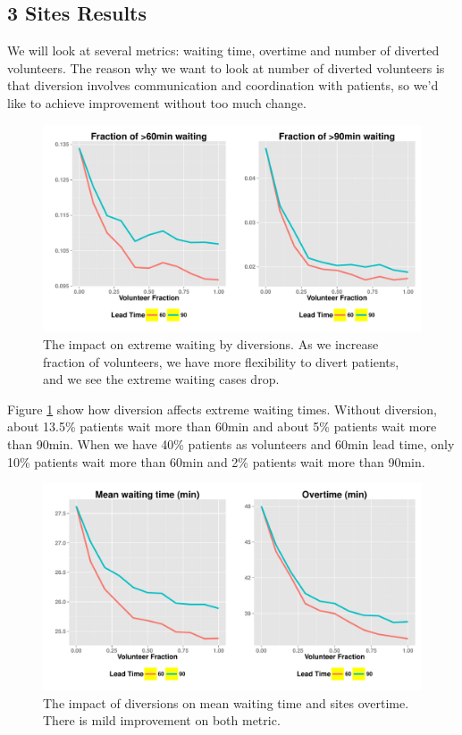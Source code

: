 \subsection{3 Sites Results}

We will look at several metrics: waiting time, overtime and number
of diverted volunteers. The reason why we want to look at number of
diverted volunteers is that diversion involves communication and
coordination with patients, so we'd like to achieve improvement
without too much change.

\begin{figure}[htp]
\centering
\includegraphics[width=.9\textwidth]{chap3/numeric/pic/3sites_extreme}
\caption{The impact on extreme waiting by diversions. As we increase
fraction of volunteers, we have more flexibility to divert patients,
and we see the extreme waiting cases drop.}
\label{fig:3sites_extreme}
\end{figure}

Figure \ref{fig:3sites_extreme} show how diversion affects extreme waiting times. Without
diversion, about 13.5\% patients wait more than 60min and about
5\% patients wait more than 90min. When we have 40\% patients
as volunteers and 60min lead time, only 10\% patients wait more
than 60min and 2\% patients wait more than 90min.

\begin{figure}[htp]
\centering
\includegraphics[width=.9\textwidth]{chap3/numeric/pic/3sites_wait_overtime}
\caption{The impact of diversions on mean waiting time and
sites overtime. There is mild improvement on both metric.}
\label{fig:3sites_wait_overtime}
\end{figure}

